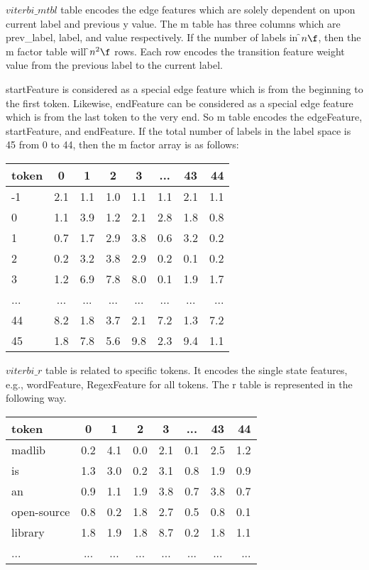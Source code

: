  $viterbi\_mtbl$ table
  encodes the edge features which are solely dependent on upon current label and
  previous y value. The m table has three columns which are prev\_label, label,
  and value respectively.
  If the number of labels in \f$ n \f$, then the m factor table will \f$ n^2 \f$
  rows. Each row encodes the transition feature weight value from the previous label
  to the current label.
 
  startFeature is considered as a special edge feature which is from the
  beginning to the first token. Likewise, endFeature can be considered
  as a special edge feature which is from the last token to the very end.
  So m table encodes the edgeFeature, startFeature, and endFeature.
  If the total number of labels in the label space is 45 from 0 to 44,
  then the m factor array is as follows:
  \begin{tabular}{l*{6}{c}r}
   token             & 0   & 1   & 2   & 3   & ... & 43 &  44 \\
   \hline
  -1                 & 2.1 & 1.1 & 1.0 & 1.1 & 1.1 & 2.1 & 1.1  \\
   0                 & 1.1 & 3.9 & 1.2 & 2.1 & 2.8 & 1.8 & 0.8  \\
   1                 & 0.7 & 1.7 & 2.9 & 3.8 & 0.6 & 3.2 & 0.2  \\
   2                 & 0.2 & 3.2 & 3.8 & 2.9 & 0.2 & 0.1 & 0.2  \\
   3                 & 1.2 & 6.9 & 7.8 & 8.0 & 0.1 & 1.9 & 1.7  \\
   ...               & ... & ... & ... & ... & ... & ... & ...  \\
   44                & 8.2 & 1.8 & 3.7 & 2.1 & 7.2 & 1.3 & 7.2  \\
   45                & 1.8 & 7.8 & 5.6 & 9.8 & 2.3 & 9.4 & 1.1  \\
  \end{tabular}
 
  $viterbi\_r$ table
  is related to specific tokens. It encodes the single state features,
  e.g., wordFeature, RegexFeature for all tokens. The r table is represented
  in the following way.\\
  \begin{tabular}{l*{6}{c}r}
   token             & 0   & 1   & 2   & 3   & ... & 43 &  44 \\
   \hline
   madlib            & 0.2 & 4.1 & 0.0 & 2.1 & 0.1 & 2.5 & 1.2  \\
   is                & 1.3 & 3.0 & 0.2 & 3.1 & 0.8 & 1.9 & 0.9  \\
   an                & 0.9 & 1.1 & 1.9 & 3.8 & 0.7 & 3.8 & 0.7  \\
   open-source       & 0.8 & 0.2 & 1.8 & 2.7 & 0.5 & 0.8 & 0.1  \\
   library           & 1.8 & 1.9 & 1.8 & 8.7 & 0.2 & 1.8 & 1.1  \\
   ...               & ... & ... & ... & ... & ... & ... & ...  \\
  \end{tabular}

